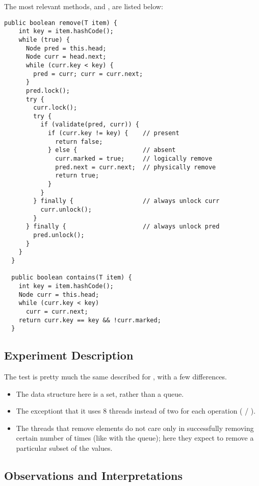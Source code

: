 The most relevant methods,  and , are listed
below: \\

\newpage
\begin{lstlisting}[style=numbers]
  public boolean remove(T item) {
    int key = item.hashCode();
    while (true) {
      Node pred = this.head;
      Node curr = head.next;
      while (curr.key < key) {
        pred = curr; curr = curr.next;
      }
      pred.lock();
      try {
        curr.lock();
        try {
          if (validate(pred, curr)) {
            if (curr.key != key) {    // present
              return false;
            } else {                  // absent
              curr.marked = true;     // logically remove
              pred.next = curr.next;  // physically remove
              return true;
            }
          }
        } finally {                   // always unlock curr
          curr.unlock();
        }
      } finally {                     // always unlock pred
        pred.unlock();
      }
    }
  }

  public boolean contains(T item) {
    int key = item.hashCode();
    Node curr = this.head;
    while (curr.key < key)
      curr = curr.next;
    return curr.key == key && !curr.marked;
  }
\end{lstlisting}
\hfill

\subsection{Experiment Description}
The test is pretty much the same described for ,
with a few differences.

\begin{itemize}
\item The data structure here is a set, rather than a queue.
\item The exceptiont that it uses 8 threads instead of two for each
  operation ( / ).
\item The threads that remove elements do not care only in
  successfully removing certain number of times (like with the queue);
  here they expect to remove a particular subset of the values.
\end{itemize}
  

\subsection{Observations and Interpretations}

